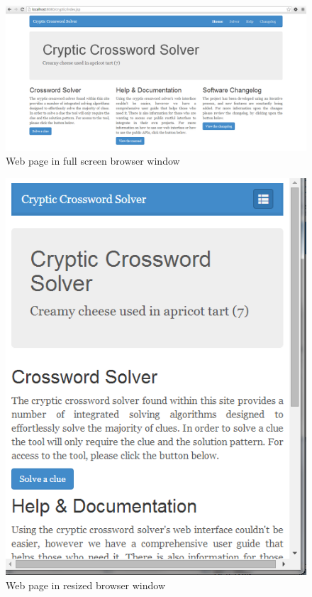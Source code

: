 \begin{figure}[H]
	\centering
	\includegraphics[keepaspectratio=true,scale=0.4]{evidence/scrolling.png}
	\caption{Web page in full screen browser window}
\end{figure}

\begin{figure}[H]
	\centering
	\includegraphics[keepaspectratio=true,scale=0.5]{evidence/scrolling1.png}
	\caption{Web page in resized browser window}
\end{figure}

